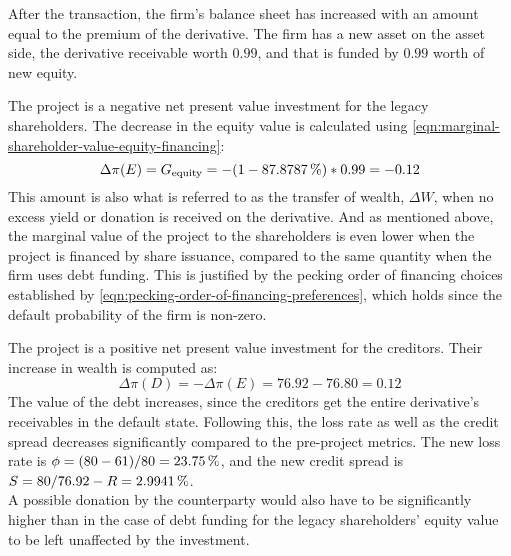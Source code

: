 \documentclass[main.tex]{subfiles}
\begin{document}
        After the transaction, the firm's balance sheet has increased with an amount equal to the premium of the derivative. 
        The firm has a new asset on the asset side, the derivative receivable worth $\num{0.99}$, and that is funded by $\num{0.99}$ worth of new equity.

        The project is a negative net present value investment for the legacy shareholders. 
        The decrease in the equity value is calculated using
        \cref{eqn:marginal-shareholder-value-equity-financing}:
        \begin{equation}
                \Delta \pi(E) 
            =  
                G_{\text{equity}}
            =
                - (\num{1} - \pct{0.878787}) * \num{0.99}
            = 
                -\num{0.12}
        \end{equation}
        This amount is also what is referred to as the transfer of wealth, $\Delta W$, when no excess yield or donation is received on the derivative. 
        And as mentioned above, the marginal value of the project to the shareholders is even lower when the project is financed by share issuance,
        compared to the same quantity when the firm uses debt funding.
        This is justified by the pecking order of financing choices established by
        \cref{eqn:pecking-order-of-financing-preferences}, 
        which holds since the default probability of the firm is non-zero.

        The project is a positive net present value investment for the creditors. 
        Their increase in wealth is computed as:
        \begin{equation}\label{eqn:wealth-transfer-equality}
            \Delta \pi(D) = -\Delta \pi(E) = \num{76.92} - \num{76.80} = \num{0.12}
        \end{equation}
        The value of the debt increases, since the creditors get the entire derivative's receivables in the default state. Following this, the loss rate as well as the credit spread decreases significantly compared to the pre-project metrics. The new loss rate is $\phi = (\num{80}-\num{61})/\num{80} = \pct{0.2375}$, and the new credit spread is $S = \num{80}/\num{76.92} - \grossrfrate = \pct{0.029941}$.
        \\
        A possible donation by the counterparty would also have to be significantly higher than in the case of debt funding for the legacy shareholders' equity value to be left unaffected by the investment. 
\end{document}
